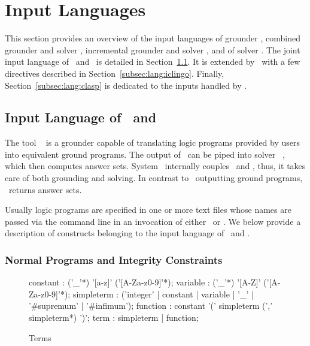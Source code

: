 \section{Input Languages}\label{sec:language}

This section provides an overview of the input languages of
grounder \gringo, combined grounder and solver \clingo,
incremental grounder and solver \iclingo, and of solver \clasp.
The joint input language of \gringo\ and \clingo\ is detailed in
Section~\ref{subsec:lang:gringo}.
It is extended by \iclingo\ with a few directives described in Section~\ref{subsec:lang:iclingo}.
Finally, Section~\ref{subsec:lang:clasp} is dedicated to the inputs
handled by \clasp.


\subsection{Input Language of \gringo\ and \clingo}\label{subsec:lang:gringo}

The tool \gringo~\cite{gescth07a} is a grounder capable of translating
logic programs provided by users into equivalent ground programs.
The output of \gringo\ can be piped into solver \clasp~\cite{gekanesc07b},
which then computes answer sets.
System \clingo\ internally couples \gringo\ and \clasp, thus,
it takes care of both grounding and solving.
In contrast to \gringo\ outputting ground programs, 
\clingo\ returns answer sets.

Usually logic programs are specified in one or more text files whose names are passed via the command line
in an invocation of either \gringo\ or \clingo.
We below provide a description of constructs belonging to the input language of \gringo\ and \clingo.


\subsubsection{Normal Programs and Integrity Constraints}\label{subsec:gringo:normal}

\begin{figure}
\begin{rail}
	constant    : ('\_'*) '[a-z]' ('[A-Za-z0-9]'*);
	variable    : ('\_'*) '[A-Z]' ('[A-Za-z0-9]'*);
	simpleterm  : ('integer' | constant | variable | '\_' | '\#supremum' | '\#infimum');
	function    : constant '(' simpleterm (',' simpleterm*) ')';
	term        : simpleterm | function;
\end{rail}
\caption{Terms\label{fig:terms}}
\end{figure}


